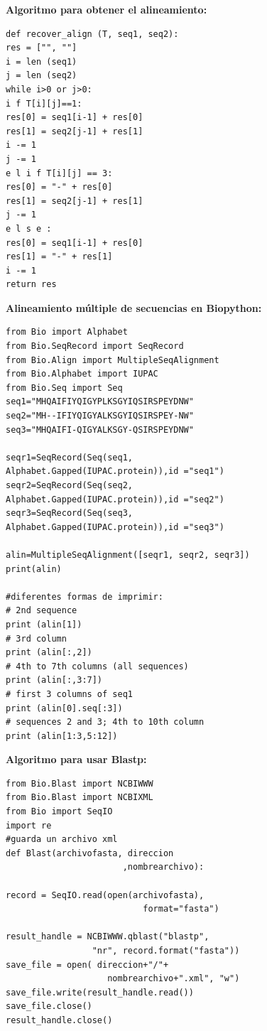 \documentclass[twocolumn,twoside,12pt]{article}
\begin{document}
\begin{itemize}
\textbf{Algoritmo para obtener el alineamiento:} \\
 \small
\begin{lstlisting}[frame=single]
def recover_align (T, seq1, seq2):
res = ["", ""]
i = len (seq1)
j = len (seq2)
while i>0 or j>0:
i f T[i][j]==1:
res[0] = seq1[i-1] + res[0]
res[1] = seq2[j-1] + res[1]
i -= 1
j -= 1
e l i f T[i][j] == 3:
res[0] = "-" + res[0]
res[1] = seq2[j-1] + res[1]
j -= 1
e l s e :
res[0] = seq1[i-1] + res[0]
res[1] = "-" + res[1]
i -= 1
return res

\end{lstlisting}
\normalsize
\textbf{Alineamiento m\'ultiple de secuencias en Biopython:}
\scriptsize
\begin{lstlisting}[frame=single]
from Bio import Alphabet
from Bio.SeqRecord import SeqRecord
from Bio.Align import MultipleSeqAlignment
from Bio.Alphabet import IUPAC
from Bio.Seq import Seq
seq1="MHQAIFIYQIGYPLKSGYIQSIRSPEYDNW"
seq2="MH--IFIYQIGYALKSGYIQSIRSPEY-NW"
seq3="MHQAIFI-QIGYALKSGY-QSIRSPEYDNW"

seqr1=SeqRecord(Seq(seq1,
Alphabet.Gapped(IUPAC.protein)),id ="seq1")
seqr2=SeqRecord(Seq(seq2,
Alphabet.Gapped(IUPAC.protein)),id ="seq2")
seqr3=SeqRecord(Seq(seq3,
Alphabet.Gapped(IUPAC.protein)),id ="seq3")
 
alin=MultipleSeqAlignment([seqr1, seqr2, seqr3])
print(alin)

#diferentes formas de imprimir:
# 2nd sequence
print (alin[1]) 
# 3rd column
print (alin[:,2]) 
# 4th to 7th columns (all sequences)
print (alin[:,3:7]) 
# first 3 columns of seq1
print (alin[0].seq[:3]) 
# sequences 2 and 3; 4th to 10th column
print (alin[1:3,5:12]) 

\end{lstlisting}	
\normalsize

\textbf{Algoritmo para usar Blastp:}\\
\scriptsize
\begin{lstlisting}[frame=single]
from Bio.Blast import NCBIWWW
from Bio.Blast import NCBIXML
from Bio import SeqIO
import re
#guarda un archivo xml
def Blast(archivofasta, direccion
                       ,nombrearchivo):
    
record = SeqIO.read(open(archivofasta),
                           format="fasta")

result_handle = NCBIWWW.qblast("blastp",
                 "nr", record.format("fasta"))
save_file = open( direccion+"/"+
                    nombrearchivo+".xml", "w")
save_file.write(result_handle.read())
save_file.close()
result_handle.close()


\end{lstlisting}
\end{itemize}
\end{document}

